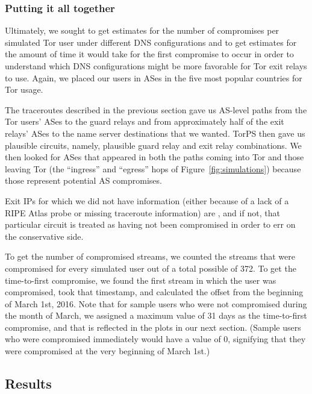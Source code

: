 \subsubsection{Putting it all together}
Ultimately, we sought to get estimates for the number of compromises per 
simulated Tor user under different DNS configurations and to get estimates 
for the amount of time it would take for the first compromise to occur 
in order to understand which DNS configurations 
might be more favorable for Tor exit relays to use. Again, we placed our users in 
ASes in the five most popular countries for Tor usage.

The traceroutes described in the previous section gave us AS-level paths from 
the Tor users' ASes to the guard relays and from approximately half of the exit 
relays' ASes to the name server destinations that we wanted. TorPS then gave us plausible 
circuits, namely, plausible guard relay and exit relay combinations. We then 
looked for ASes that appeared in both the paths coming into Tor and those 
leaving Tor (the ``ingress'' and ``egress'' hops of Figure~\ref{fig:simulations}) 
because those represent potential AS compromises.

Exit IPs for which we did not have information (either because of a lack of a 
RIPE Atlas probe or missing traceroute information) are , and if not, that 
particular circuit is treated as having not been compromised in order to err on the 
conservative side. 

To get the number of compromised streams, we counted the streams that were compromised 
for every simulated user out of a total possible of 372. To get the time-to-first compromise, 
we found the first stream in which the user was compromised, took that timestamp, and 
calculated the offset from the beginning of March 1st, 2016. Note that for sample users 
who were not compromised during the month of March, we assigned a maximum value 
of 31 days as the time-to-first compromise, and that is reflected in the plots in our 
next section. (Sample users who were compromised immediately would have a value of 0, 
signifying that they were compromised at the very beginning of March 1st.)

\subsection{Results}

